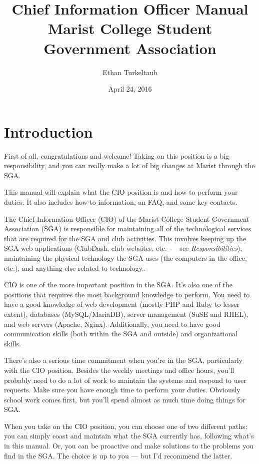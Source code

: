 \documentclass[11pt]{report}
\begin{document}
\title{\textbf{Chief Information Officer Manual} \\ Marist College Student Government Association}
\date{April 24, 2016}
\author{Ethan Turkeltaub}
\maketitle

\tableofcontents

\chapter{Introduction}

	First of all, congratulations and welcome! Taking on this position is a big responsibility, and you can really make a lot of big changes at Marist through the SGA.
	
	This manual will explain what the CIO position is and how to perform your duties. It also includes how-to information, an FAQ, and some key contacts.
	
	\hfill

	The Chief Information Officer (CIO) of the Marist College Student Government Association (SGA) is responsible for maintaining all of the technological services that are required for the SGA and club activities. This involves keeping up the SGA web applications (ClubDash, club websites, etc. — see \textit{Responsibilities}), maintaining the physical technology the SGA uses (the computers in the office, etc.), and anything else related to technology..
	
	CIO is one of the more important position in the SGA. It's also one of the positions that requires the most background knowledge to perform. You need to have a good knowledge of web development (mostly PHP and Ruby to lesser extent), databases (MySQL/MariaDB), server management (SuSE and RHEL), and web servers (Apache, Nginx). Additionally, you need to have good communication skills (both within the SGA and outside) and organizational skills.
	
	There's also a serious time commitment when you're in the SGA, particularly with the CIO position. Besides the weekly meetings and office hours, you'll probably need to do a lot of work to maintain the systems and respond to user requests. Make sure you have enough time to perform your duties. Obviously school work comes first, but you'll spend almost as much time doing things for SGA.
	
	When you take on the CIO position, you can choose one of two different paths: you can simply coast and maintain what the SGA currently has, following what's in this manual. Or, you can be proactive and make solutions to the problems you find in the SGA. The choice is up to you --- but I'd recommend the latter.
	
\end{document}
